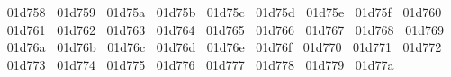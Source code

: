 {  ^^^^^^01d758%
  ^^^^^^01d759%
  ^^^^^^01d75a%
  ^^^^^^01d75b%
  ^^^^^^01d75c%
  ^^^^^^01d75d%
  ^^^^^^01d75e%
  ^^^^^^01d75f%
  ^^^^^^01d760%
  ^^^^^^01d761%
  ^^^^^^01d762%
  ^^^^^^01d763%
  ^^^^^^01d764%
  ^^^^^^01d765%
  ^^^^^^01d766%
  ^^^^^^01d767%
  ^^^^^^01d768%
  ^^^^^^01d769%
  ^^^^^^01d76a%
  ^^^^^^01d76b%
  ^^^^^^01d76c%
  ^^^^^^01d76d%
  ^^^^^^01d76e%
  ^^^^^^01d76f%
  ^^^^^^01d770%
  ^^^^^^01d771%
  ^^^^^^01d772%
  ^^^^^^01d773%
  ^^^^^^01d774%
  ^^^^^^01d775%
  ^^^^^^01d776%
  ^^^^^^01d777%
  ^^^^^^01d778%
  ^^^^^^01d779%
  ^^^^^^01d77a%
}
